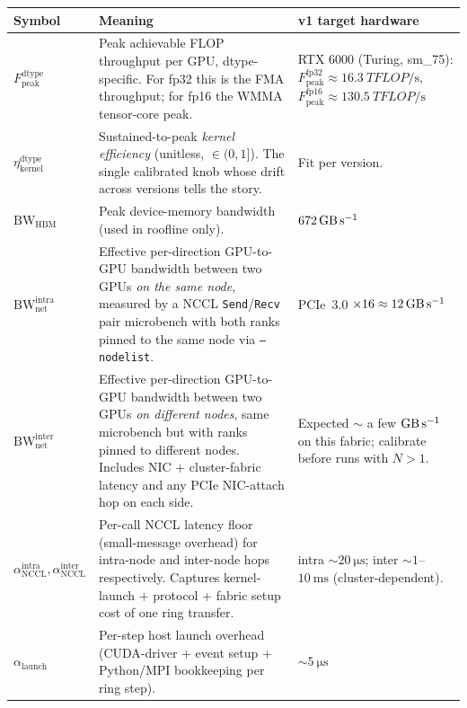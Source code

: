 \documentclass[11pt]{article}
\newcommand{\bw}{\mathrm{BW}}
\newcommand{\peak}{\mathrm{peak}}
\newcommand{\dtype}{\mathrm{dtype}}
\begin{document}
\begin{longtable}{@{}p{3.0cm}p{6.5cm}p{4.5cm}@{}}
  \toprule
  Symbol & Meaning & v1 target hardware \\
  \midrule
  $F_{\peak}^{\dtype}$ &
    Peak achievable FLOP throughput per GPU, dtype-specific.
    For fp32 this is the FMA throughput; for fp16 the WMMA tensor-core peak.
    & RTX 6000 (Turing, sm\_75): \newline
      $F_{\peak}^{\text{fp32}} \approx \SI{16.3}{TFLOP\per\second}$, \newline
      $F_{\peak}^{\text{fp16}} \approx \SI{130.5}{TFLOP\per\second}$ \\
  $\eta_{\text{kernel}}^{\dtype}$ &
    Sustained-to-peak \emph{kernel efficiency} (unitless, $\in (0,1]$).
    The single calibrated knob whose drift across versions tells the story.
    & Fit per version. \\
  $\bw_{\text{HBM}}$ &
    Peak device-memory bandwidth (used in roofline only). & $\SI{672}{\giga\byte\per\second}$ \\
  $\bw_{\text{net}}^{\text{intra}}$ &
    Effective per-direction GPU-to-GPU bandwidth between two GPUs
    \emph{on the same node}, measured by a NCCL
    \texttt{Send}/\texttt{Recv} pair microbench with both ranks pinned
    to the same node via \texttt{--nodelist}. & PCIe~3.0 $\times 16 \approx \SI{12}{\giga\byte\per\second}$ \\
  $\bw_{\text{net}}^{\text{inter}}$ &
    Effective per-direction GPU-to-GPU bandwidth between two GPUs
    \emph{on different nodes}, same microbench but with ranks pinned
    to different nodes. Includes NIC + cluster-fabric latency and any
    PCIe NIC-attach hop on each side. & Expected
    $\sim$ a few $\si{\giga\byte\per\second}$ on this fabric;
    calibrate before runs with $N > 1$. \\
  $\alpha_{\text{NCCL}}^{\text{intra}}, \alpha_{\text{NCCL}}^{\text{inter}}$ &
    Per-call NCCL latency floor (small-message overhead) for
    intra-node and inter-node hops respectively.
    Captures kernel-launch + protocol + fabric setup cost of one
    ring transfer. & intra $\sim \SI{20}{\micro\second}$; inter
    $\sim 1$--$\SI{10}{\milli\second}$ (cluster-dependent). \\
  $\alpha_{\text{launch}}$ &
    Per-step host launch overhead (CUDA-driver + event setup +
    Python/MPI bookkeeping per ring step). & $\sim \SI{5}{\micro\second}$ \\
  \bottomrule
\end{longtable}
\end{document}

